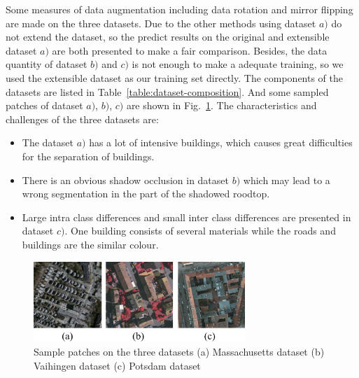 Some measures of data augmentation including data rotation and mirror flipping are made on the three datasets.
Due to the other methods using dataset ${a)}$ do not extend the dataset, so the predict results on the original and extensible dataset $a)$ are both presented to make a fair comparison.
Besides, the data quantity of dataset ${b)}$ and ${c)}$ is not enough to make a adequate training, so we used the extensible dataset as our training set directly.
The components of the datasets are listed in Table~\ref{table:dataset-composition}.
And some sampled patches of dataset ${a)}$, ${b)}$, ${c)}$ are shown in Fig.~\ref{fig:dataset_sample}.
The characteristics and challenges of the three datasets are:
\begin{itemize}
 \item The dataset ${a)}$ has a lot of intensive buildings, which causes great difficulties for the separation of buildings.
 \item There is an obvious shadow occlusion in dataset ${b)}$ which may lead to a wrong segmentation in the part of the shadowed roodtop.
 \item Large intra class differences and small inter class differences are presented in dataset ${c)}$. One building consists of several materials while the roads and buildings are the similar colour. 
\end{itemize}


\begin{figure}
\centering
\includegraphics[width=8cm]{Figures/datasets.eps}
\caption{Sample patches on the three datasets  (a) Massachusetts dataset (b) Vaihingen dataset (c) Potsdam dataset}
\label{fig:dataset_sample}
\end{figure}

